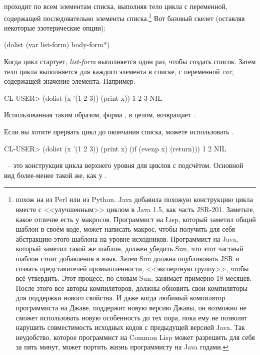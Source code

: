  проходит по всем элементам списка, выполняя тело цикла с переменной,
содержащей последовательно элементы списка.\footnote{ похож на 
  из Perl или  из Python. Java добавила похожую конструкцию цикла вместе с
  <<улучшенным>>  циклом в Java 1.5, как часть JSR-201. Заметьте, какое отличие
  есть у макросов. Программист на Lisp, который заметил общий шаблон в своём коде, может
  написать макрос, чтобы получить для себя абстракцию этого шаблона на уровне
  исходников. Программист на Java, который заметил такой же шаблон, должен убедить Sun,
  что этот частный шаблон стоит добавления в язык. Затем Sun должна опубликовать JSR и
  созвать представителей промышленности, <<экспертную группу>>, чтобы всё утвердить. Этот
  процесс, по словам Sun, занимает примерно 18 месяцев. После этого все авторы
  компиляторов, должны обновить свои компиляторы для поддержки нового свойства. И даже
  когда любимый компилятор программиста на Джаве, поддержит новую версию Джавы, он
  возможно не сможет использовать новую особенность до тех пора, пока ему не позволят
  нарушить совместимость исходных кодов с предыдущей версией Java. Так неудобство,
  которое программист на Common Lisp может разрешить для себя за пять минут, может портить
  жизнь программисту на Java годами.} Вот базовый скелет (оставляя некоторые
эзотерические опции):

\begin{myverb}
(dolist (var list-form)
  body-form*)
\end{myverb}

Когда цикл стартует, \textit{list-form} выполняется один раз, чтобы создать список. Затем
тело цикла выполняется для каждого элемента в списке, с переменной \textit{var},
содержащей значение элемента. Например:

\begin{myverb}
CL-USER> (dolist (x '(1 2 3)) (print x))
1
2
3
NIL
\end{myverb}

Использованная таким образом, форма , в целом, возвращает .

Если вы хотите прервать цикл  до окончания списка, можете использовать
.

\begin{myverb}
CL-USER> (dolist (x '(1 2 3)) (print x) (if (evenp x) (return)))
1
2
NIL
\end{myverb}

~-- это конструкция цикла верхнего уровня для циклов с подсчётом. Основной
вид более-менее такой же, как у .

